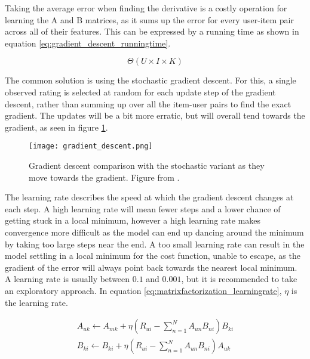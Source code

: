 Taking the average error when finding the derivative is a costly operation for learning the A and B matrices, as it sums up the error for every user-item pair across all of their features. This can be expressed by a running time as shown in equation \ref{eq:gradient_descent_runningtime}.

\begin{equation}\label{eq:gradient_descent_runningtime}
	\Theta(U\times I \times K)
\end{equation}

The common solution is using the stochastic gradient descent. For this, a single observed rating is selected at random for each update step of the gradient descent, rather than summing up over all the item-user pairs to find the exact gradient. The updates will be a bit more erratic, but will overall tend towards the gradient, as seen in figure \ref{fig:gradientDescent}.

\begin{figure}\label{fig:gradientDescent}
	\centering
	\texttt{[image: gradient\_descent.png]}
	\caption{Gradient descent comparison with the stochastic variant as they move towards the gradient. Figure from \cite{Thiesson}.}
\end{figure}

The learning rate describes the speed at which the gradient descent changes at each step. A high learning rate will mean fewer steps and a lower chance of getting stuck in a local minimum, however a high learning rate makes convergence more difficult as the model can end up dancing around the minimum by taking too large steps near the end. A too small learning rate can result in the model settling in a local minimum for the cost function, unable to escape, as the gradient of the error will always point back towards the nearest local minimum. A learning rate is usually between $0.1$ and $0.001$, but it is recommended to take an exploratory approach. In equation \ref{eq:matrixfactorization_learningrate}, $\eta$ is the learning rate.

\begin{equation}\label{eq:matrixfactorization_learningrate}
	\begin{split}
	A_{uk}\leftarrow A_{mk} + \eta(R_{ui}-\sum_{n=1}^{N}A_{un}B_{ni})B_{ki}
	\\
	B_{ki}\leftarrow B_{ki} + \eta(R_{ui}-\sum_{n=1}^{N}A_{un}B_{ni})A_{uk}
	\end{split}
\end{equation}

